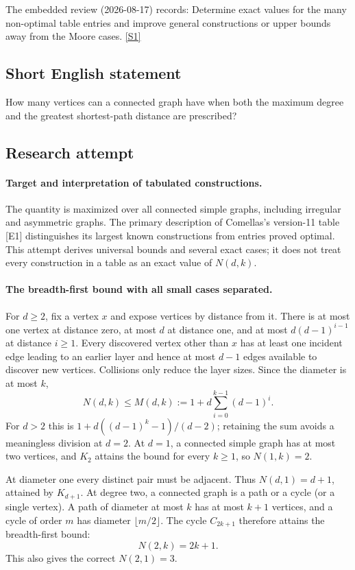 \documentclass[11pt,a4paper]{article}
\newcommand{\sref}[2]{\hyperlink{source:#1:#2}{[S#2]}}
\begin{document}
The embedded review (2026-08-17) records: Determine exact values for the many non-optimal table entries and improve general constructions or upper bounds away from the Moore cases. \sref{statement}{1}

\subsection{Short English statement}

How many vertices can a connected graph have when both the maximum degree and the greatest shortest-path distance are prescribed?

\subsection{Research attempt}

\paragraph{Target and interpretation of tabulated constructions.}
The quantity is maximized over all connected simple graphs, including
irregular and asymmetric graphs. The primary description of Comellas's
version-11 table [E1] distinguishes its largest known constructions
from entries proved optimal. This attempt derives universal bounds and
several exact cases; it does not treat every construction in a table as
an exact value of $N(d,k)$.

\paragraph{The breadth-first bound with all small cases separated.}
For $d\ge2$, fix a vertex $x$ and expose vertices by distance from it.
There is at most one vertex at distance zero, at most $d$ at distance
one, and at most $d(d-1)^{i-1}$ at distance $i\ge1$. Every discovered
vertex other than $x$ has at least one incident edge leading to an
earlier layer and hence at most $d-1$ edges available to discover new
vertices. Collisions only reduce the layer sizes. Since the diameter
is at most $k$,
\[
 N(d,k)\le M(d,k):=1+d\sum_{i=0}^{k-1}(d-1)^i.
\]
For $d>2$ this is $1+d((d-1)^k-1)/(d-2)$; retaining the sum
avoids a meaningless division at $d=2$. At $d=1$, a connected simple
graph has at most two vertices, and $K_2$ attains the bound for every
$k\ge1$, so $N(1,k)=2$.

At diameter one every distinct pair must be adjacent. Thus
$N(d,1)=d+1$, attained by $K_{d+1}$. At degree two, a connected
graph is a path or a cycle (or a single vertex). A path of diameter
at most $k$ has at most $k+1$ vertices, and a cycle of order $m$ has
diameter $\lfloor m/2\rfloor$. The cycle $C_{2k+1}$ therefore
attains the breadth-first bound:
\[
                        N(2,k)=2k+1.
\]
This also gives the correct $N(2,1)=3$.
\end{document}
